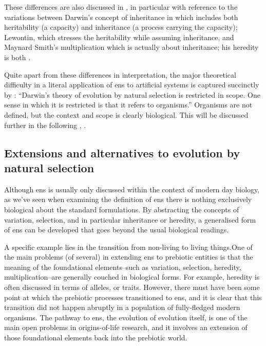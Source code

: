 These differences are also discussed in \textcite{Griesemer2001}, in particular with reference to the variations between Darwin's concept of inheritance in \textcite{Darwin1859} which includes both heritability (a capacity) and inheritance (a process carrying the capacity); Lewontin, which stresses the heritability while assuming inheritance, and Maynard Smith's multiplication which is actually about inheritance; his heredity is both \parencite{Griesemer2001}.

Quite apart from these differences in interpretation, the major theoretical difficulty in a literal application of \gls{ens} to artificial systems is captured succinctly by \textcite{Griesemer2005}: ``Darwin's theory of evolution by natural selection is restricted in scope. One sense in which it is restricted is that it refers to organisms.'' Organisms are not defined, but the context and scope is clearly biological. This will be discussed further in the following , .

\subsection{Extensions and alternatives to evolution by natural selection}\label{alternatives-to-evolution-by-natural-selection}

Although \gls{ens} is usually only discussed within the context of modern day biology, as we've seen when examining the definition of \gls{ens} there is nothing exclusively biological about the standard formulations. By abstracting the concepts of variation, selection, and in particular inheritance or heredity, a generalised form of \gls{ens} can be developed that goes beyond the usual biological readings. 

A specific example lies in the transition from non-living to living things.One of the main problems (of several) in extending \gls{ens} to prebiotic entities is that the meaning of the foundational elements--such as variation, selection, heredity, multiplication--are generally couched in biological forms. For example, heredity is often discussed in terms of alleles, or traits. However, there must have been some point at which the prebiotic processes transitioned to \gls{ens}, and it is clear that this transition did not happen abruptly in a population of fully-fledged modern organisms. The pathway to \gls{ens}, the evolution of evolution itself, is one of the main open problems in origins-of-life research, and it involves an extension of those foundational elements back into the prebiotic world.

